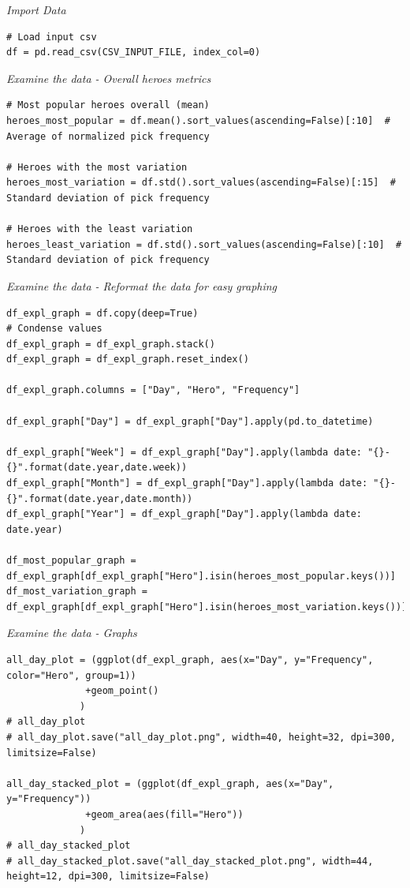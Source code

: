 \emph{Import Data}
\begin{verbatim}
# Load input csv
df = pd.read_csv(CSV_INPUT_FILE, index_col=0)
\end{verbatim}

\emph{Examine the data - Overall heroes metrics}
\begin{verbatim}
# Most popular heroes overall (mean)
heroes_most_popular = df.mean().sort_values(ascending=False)[:10]  # Average of normalized pick frequency

# Heroes with the most variation
heroes_most_variation = df.std().sort_values(ascending=False)[:15]  # Standard deviation of pick frequency

# Heroes with the least variation
heroes_least_variation = df.std().sort_values(ascending=False)[:10]  # Standard deviation of pick frequency
\end{verbatim}

\emph{Examine the data - Reformat the data for easy graphing}
\begin{verbatim}
df_expl_graph = df.copy(deep=True)
# Condense values
df_expl_graph = df_expl_graph.stack()
df_expl_graph = df_expl_graph.reset_index()

df_expl_graph.columns = ["Day", "Hero", "Frequency"]

df_expl_graph["Day"] = df_expl_graph["Day"].apply(pd.to_datetime)

df_expl_graph["Week"] = df_expl_graph["Day"].apply(lambda date: "{}-{}".format(date.year,date.week))
df_expl_graph["Month"] = df_expl_graph["Day"].apply(lambda date: "{}-{}".format(date.year,date.month))
df_expl_graph["Year"] = df_expl_graph["Day"].apply(lambda date: date.year)

df_most_popular_graph = df_expl_graph[df_expl_graph["Hero"].isin(heroes_most_popular.keys())]
df_most_variation_graph = df_expl_graph[df_expl_graph["Hero"].isin(heroes_most_variation.keys())]
\end{verbatim}

\emph{Examine the data - Graphs}
\begin{verbatim}
all_day_plot = (ggplot(df_expl_graph, aes(x="Day", y="Frequency", color="Hero", group=1))
              +geom_point()
             )
# all_day_plot
# all_day_plot.save("all_day_plot.png", width=40, height=32, dpi=300, limitsize=False)

all_day_stacked_plot = (ggplot(df_expl_graph, aes(x="Day", y="Frequency"))
              +geom_area(aes(fill="Hero"))
             )
# all_day_stacked_plot
# all_day_stacked_plot.save("all_day_stacked_plot.png", width=44, height=12, dpi=300, limitsize=False)
\end{verbatim}


